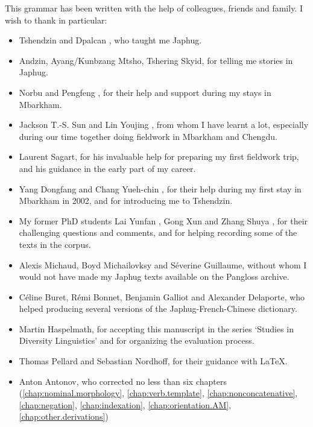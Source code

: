 %
%

This grammar has been written with the help of colleagues, friends and family. I wish to thank in particular:

\begin{itemize}
	\item Tshendzin  and  Dpalcan , who taught me Japhug.
	\item Andzin, Ayang/Kunbzang Mtsho,   Tshering Skyid, for telling me stories in Japhug.
	\item Norbu  and Pengfeng , for their help and support during my stays in Mbarkham.
	\item Jackson T.-S. Sun  and Lin Youjing , from whom I have learnt a lot, especially during our time together doing fieldwork in Mbarkham and Chengdu.	
	\item Laurent Sagart, for his invaluable help for preparing my first fieldwork trip, and his guidance in the early part of my career.
	\item 	Yang Dongfang  and Chang Yueh-chin , for their help during my first stay in Mbarkham in 2002, and for introducing me to Tshendzin.
	\item My former PhD students Lai Yunfan , Gong Xun  and Zhang Shuya , for their challenging questions and comments, and for helping recording some of the texts in the corpus.
	\item Alexis Michaud, Boyd Michailovksy and Séverine Guillaume, without whom I would not have made my Japhug texts available on the Pangloss archive.
	\item Céline Buret, Rémi Bonnet, Benjamin Galliot and Alexander Delaporte, who helped producing several versions of the Japhug-French-Chinese dictionary.
	\item Martin Haspelmath, for accepting this manuscript in the series `Studies in Diversity Linguistics' and for organizing the evaluation process.
	\item Thomas Pellard and Sebastian Nordhoff, for their guidance with \LaTeX.
	\item Anton Antonov, who corrected no less than six chapters (\ref{chap:nominal.morphology}, \ref{chap:verb.template}, \ref{chap:nonconcatenative}, \ref{chap:negation}, \ref{chap:indexation}, \ref{chap:orientation.AM}, \ref{chap:other.derivations})

\end{itemize}

